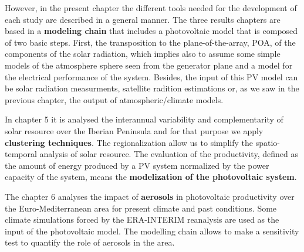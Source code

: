 However, in the present chapter the different tools needed for the development of each study are described in a general manner. The three results chapters are based in a \textbf{modeling chain} that includes a photovoltaic model that is composed of two basic steps. First, the transposition to the plane-of-the-array, POA, of the components of the solar radiation, which implies also to assume some simple models of the atmosphere sphere seen from the generator plane and a model for the electrical performance of the system. Besides, the input of this PV model can be solar radiation measurments, satellite radition estimations or, as we saw in the previous chapter, the output of atmospheric/climate models. 


  In chapter 5 it is analysed the interannual variability and complementarity of solar resource over the Iberian Peninsula and for that purpose we apply \textbf{clustering techniques}. The regionalization allow us to simplify the spatio-temporal analysis of solar resource. The evaluation of the productivity, defined as the amount of energy produced by a PV system normalized by the power capacity of the system, means the \textbf{modelization of the photovoltaic system}.
  
  The chapter 6 analyses the impact of \textbf{aerosols} in photovoltaic productivity over the Euro-Mediterranean area for present climate and past conditions.  Some climate simulations forced by the ERA-INTERIM reanalysis are used as the input of the photovoltaic model. The modelling chain allows to make a sensitivity test to quantify the role of aerosols in the area.

